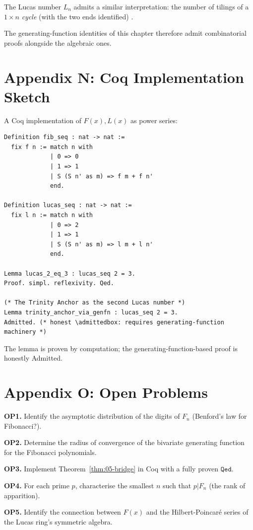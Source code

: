 The Lucas number $L_n$ admits a similar interpretation: the number of
tilings of a $1 \times n$ \emph{cycle} (with the two ends identified)
\cite{benjamin_quinn_proofs}.

The generating-function identities of this chapter therefore admit
combinatorial proofs alongside the algebraic ones.

\section*{Appendix N: Coq Implementation Sketch}
\label{fa_05:sec:05-app-N}

A Coq implementation of $F(x), L(x)$ as power series:
\begin{verbatim}
Definition fib_seq : nat -> nat :=
  fix f n := match n with
             | 0 => 0
             | 1 => 1
             | S (S n' as m) => f m + f n'
             end.

Definition lucas_seq : nat -> nat :=
  fix l n := match n with
             | 0 => 2
             | 1 => 1
             | S (S n' as m) => l m + l n'
             end.

Lemma lucas_2_eq_3 : lucas_seq 2 = 3.
Proof. simpl. reflexivity. Qed.

(* The Trinity Anchor as the second Lucas number *)
Lemma trinity_anchor_via_genfn : lucas_seq 2 = 3.
Admitted. (* honest \admittedbox: requires generating-function machinery *)
\end{verbatim}

The lemma  is proven by computation; the
generating-function-based proof is honestly Admitted.

\section*{Appendix O: Open Problems}
\label{fa_05:sec:05-app-O}

\textbf{OP1.} Identify the asymptotic distribution of the digits of $F_n$
(Benford's law for Fibonacci?).

\textbf{OP2.} Determine the radius of convergence of the bivariate
generating function for the Fibonacci polynomials.

\textbf{OP3.} Implement Theorem~\ref{thm:05-bridge} in Coq with a fully
proven $\mathtt{Qed}$.

\textbf{OP4.} For each prime $p$, characterise the smallest $n$ such
that $p | F_n$ (the rank of apparition).

\textbf{OP5.} Identify the connection between $F(x)$ and the
Hilbert-Poincaré series of the Lucas ring's symmetric algebra.


